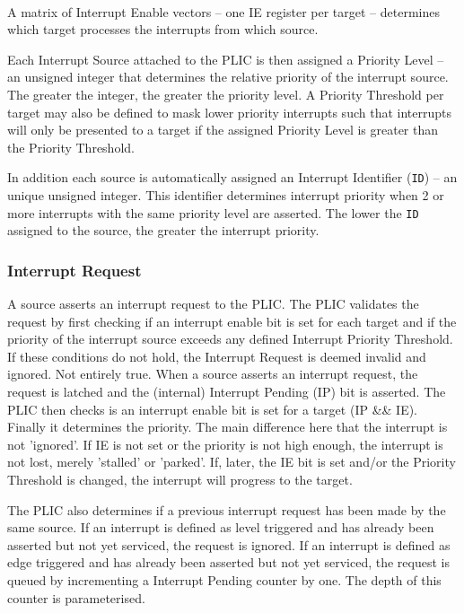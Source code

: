 \paragraph{}

A matrix of Interrupt Enable vectors -- one IE register per target --
determines which target processes the interrupts from which source.

Each Interrupt Source attached to the PLIC is then assigned a Priority
Level -- an unsigned integer that determines the relative priority of
the interrupt source. The greater the integer, the greater the priority
level. A Priority Threshold per target may also be defined to mask lower
priority interrupts such that interrupts will only be presented to a
target if the assigned Priority Level is greater than the Priority Threshold.

In addition each source is automatically assigned an Interrupt Identifier
(\texttt{ID}) -- an unique unsigned integer. This identifier determines
interrupt priority when 2 or more interrupts with the same priority
level are asserted. The lower the \texttt{ID} assigned to the source,
the greater the interrupt priority.

\subsubsection{Interrupt Request}

A source asserts an interrupt request to the PLIC. The PLIC validates
the request by first checking if an interrupt enable bit is set for each
target and if the priority of the interrupt source exceeds any defined
Interrupt Priority Threshold. If these conditions do not hold, the
Interrupt Request is deemed invalid and ignored.
\comment
Not entirely true. When a source asserts an interrupt request, the request is latched and the (internal) Interrupt Pending (IP) bit is asserted.
The PLIC then checks is an interrupt enable bit is set for a target (IP && IE). Finally it determines the priority.
The main difference here that the interrupt is not 'ignored'. If IE is not set or the priority is not high enough, the interrupt is not lost, merely 'stalled' or 'parked'.
If, later, the IE bit is set and/or the Priority Threshold is changed, the interrupt will progress to the target.
\endcomment

The PLIC also determines if a previous interrupt request has been made
by the same source. If an interrupt is defined as level triggered and
has already been asserted but not yet serviced, the request is ignored.
If an interrupt is defined as edge triggered and has already been
asserted but not yet serviced, the request is queued by incrementing a
Interrupt Pending counter by one. The depth of this counter is
parameterised.

